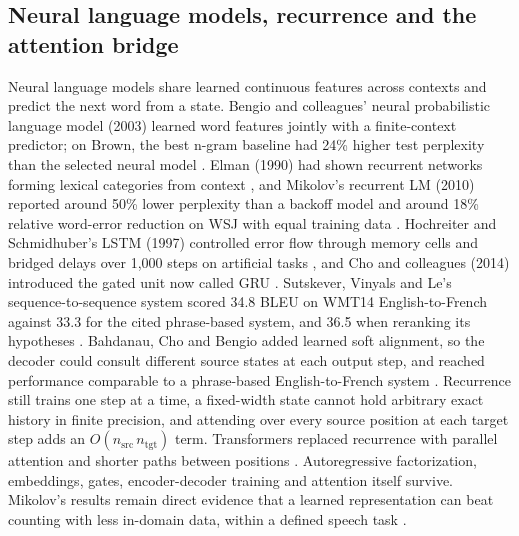\subsection{Neural language models, recurrence and the attention bridge}
Neural language models share learned continuous features across contexts and predict the next word from a state. Bengio and colleagues' neural probabilistic language model (2003) learned word features jointly with a finite-context predictor; on Brown, the best n-gram baseline had 24\% higher test perplexity than the selected neural model \cite{pre17}. Elman (1990) had shown recurrent networks forming lexical categories from context \cite{pre59}, and Mikolov's recurrent LM (2010) reported around 50\% lower perplexity than a backoff model and around 18\% relative word-error reduction on WSJ with equal training data \cite{pre18}. Hochreiter and Schmidhuber's LSTM (1997) controlled error flow through memory cells and bridged delays over 1,000 steps on artificial tasks \cite{pre19}, and Cho and colleagues (2014) introduced the gated unit now called GRU \cite{pre20}. Sutskever, Vinyals and Le's sequence-to-sequence system scored 34.8 BLEU on WMT14 English-to-French against 33.3 for the cited phrase-based system, and 36.5 when reranking its hypotheses \cite{pre21}. Bahdanau, Cho and Bengio added learned soft alignment, so the decoder could consult different source states at each output step, and reached performance comparable to a phrase-based English-to-French system \cite{pre22}. Recurrence still trains one step at a time, a fixed-width state cannot hold arbitrary exact history in finite precision, and attending over every source position at each target step adds an $O(n_{\mathrm{src}}\,n_{\mathrm{tgt}})$ term. Transformers replaced recurrence with parallel attention and shorter paths between positions \cite{pre52}. Autoregressive factorization, embeddings, gates, encoder-decoder training and attention itself survive. Mikolov's results remain direct evidence that a learned representation can beat counting with less in-domain data, within a defined speech task \cite{pre18}.

